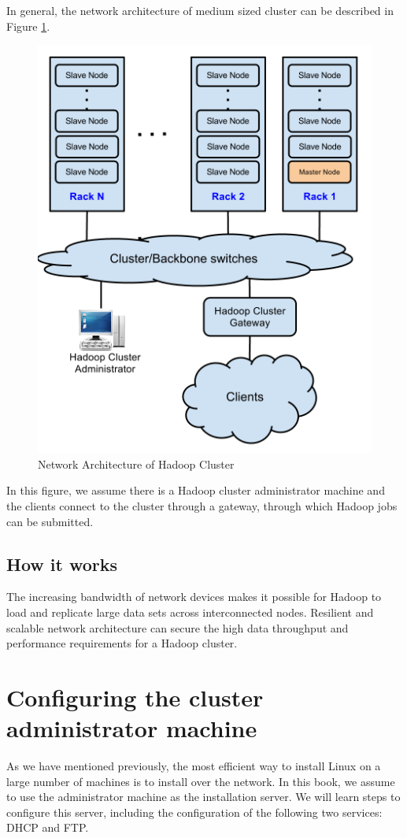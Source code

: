 In general, the network architecture of medium sized cluster can be described in Figure \ref{fig:network.architecture}.
\begin{figure}[ht]
  \centering
  \includegraphics[width=.6\textwidth]{figs/5163os_02_01.png}
  \caption{Network Architecture of Hadoop Cluster}\label{fig:network.architecture}
\end{figure} 
In this figure, we assume there is a Hadoop cluster administrator machine and the clients connect to the cluster through a gateway, through which Hadoop jobs can be submitted.
\subsection*{How it works}
The increasing bandwidth of network devices makes it possible for Hadoop to load and replicate large data sets across interconnected nodes. Resilient and scalable network architecture can secure the high data throughput and performance requirements for a Hadoop cluster.

\section{Configuring the cluster administrator machine}
As we have mentioned previously, the most efficient way to install Linux on a large number of machines is to install over the network. In this book, we assume to use the administrator machine as the installation server. We will learn steps to configure this server, including the configuration of the following two services: DHCP and FTP.


